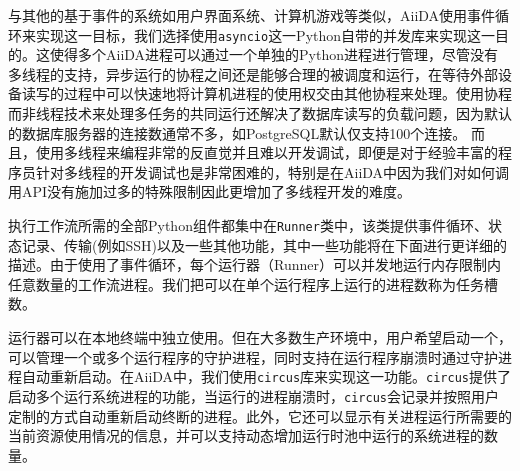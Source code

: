 与其他的基于事件的系统如用户界面系统、计算机游戏等类似，AiiDA使用事件循环来实现这一目标，我们选择使用\texttt{asyncio}这一Python自带的并发库来实现这一目的。这使得多个AiiDA进程可以通过一个单独的Python进程进行管理，尽管没有多线程的支持，异步运行的协程之间还是能够合理的被调度和运行，在等待外部设备读写的过程中可以快速地将计算机进程的使用权交由其他协程来处理。使用协程而非线程技术来处理多任务的共同运行还解决了数据库读写的负载问题，因为默认的数据库服务器的连接数通常不多，如PostgreSQL默认仅支持100个连接。
而且，使用多线程来编程非常的反直觉并且难以开发调试，即便是对于经验丰富的程序员针对多线程的开发调试也是非常困难的，特别是在AiiDA中因为我们对如何调用API没有施加过多的特殊限制因此更增加了多线程开发的难度。

执行工作流所需的全部Python组件都集中在\texttt{Runner}类中，该类提供事件循环、状态记录、传输(例如SSH)以及一些其他功能，其中一些功能将在下面进行更详细的描述。由于使用了事件循环，每个运行器（Runner）可以并发地运行内存限制内任意数量的工作流进程。我们把可以在单个运行程序上运行的进程数称为任务槽数。

运行器可以在本地终端中独立使用。但在大多数生产环境中，用户希望启动一个，可以管理一个或多个运行程序的守护进程，同时支持在运行程序崩溃时通过守护进程自动重新启动。在AiiDA中，我们使用\texttt{circus}库\cite{circus}来实现这一功能。\texttt{circus}提供了启动多个运行系统进程的功能，当运行的进程崩溃时，\texttt{circus}会记录并按照用户定制的方式自动重新启动终断的进程。此外，它还可以显示有关进程运行所需要的当前资源使用情况的信息，并可以支持动态增加运行时池中运行的系统进程的数量。

